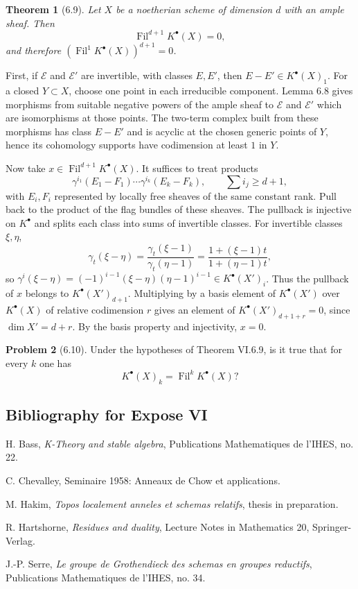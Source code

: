 \documentclass[11pt]{article}
\theoremstyle{plain}
\newtheorem{theorem}{Theorem}[section]
\theoremstyle{definition}
\newtheorem{problem}[theorem]{Problem}
\theoremstyle{remark}
\providecommand{\Fil}{\operatorname{Fil}}
\begin{document}
\begin{theorem}[6.9]\label{thm:VI.6.9}
Let $X$ be a noetherian scheme of dimension $d$ with an ample sheaf. Then
\[
\Fil^{d+1}K^{\bullet}(X)=0,
\]
and therefore $(\Fil^1K^{\bullet}(X))^{d+1}=0$.
\end{theorem}

First, if $\mathcal E$ and $\mathcal E'$ are invertible, with classes $E,E'$, then $E-E'\in K^{\bullet}(X)_1$. For a closed $Y\subset X$, choose one point in each irreducible component. Lemma 6.8 gives morphisms from suitable negative powers of the ample sheaf to $\mathcal E$ and $\mathcal E'$ which are isomorphisms at those points. The two-term complex built from these morphisms has class $E-E'$ and is acyclic at the chosen generic points of $Y$, hence its cohomology supports have codimension at least $1$ in $Y$.

Now take $x\in\Fil^{d+1}K^{\bullet}(X)$. It suffices to treat products
\[
\gamma^{i_1}(E_1-F_1)\cdots\gamma^{i_k}(E_k-F_k),
\qquad
\sum i_j\geq d+1,
\]
with $E_i,F_i$ represented by locally free sheaves of the same constant rank. Pull back to the product of the flag bundles of these sheaves. The pullback is injective on $K^{\bullet}$ and splits each class into sums of invertible classes. For invertible classes $\xi,\eta$,
\[
\gamma_t(\xi-\eta)=\frac{\gamma_t(\xi-1)}{\gamma_t(\eta-1)}=\frac{1+(\xi-1)t}{1+(\eta-1)t},
\]
so $\gamma^i(\xi-\eta)=(-1)^{i-1}(\xi-\eta)(\eta-1)^{i-1}\in K^{\bullet}(X')_i$. Thus the pullback of $x$ belongs to $K^{\bullet}(X')_{d+1}$. Multiplying by a basis element of $K^{\bullet}(X')$ over $K^{\bullet}(X)$ of relative codimension $r$ gives an element of $K^{\bullet}(X')_{d+1+r}=0$, since $\dim X'=d+r$. By the basis property and injectivity, $x=0$.

\begin{problem}[6.10]
Under the hypotheses of Theorem VI.6.9, is it true that for every $k$ one has
\[
K^{\bullet}(X)_k=\Fil^kK^{\bullet}(X)?
\]
\end{problem}

\subsection*{Bibliography for Expose VI}
\begin{enumerate}[label={[\arabic*]}]
\item H. Bass, \emph{K-Theory and stable algebra}, Publications Mathematiques de l'IHES, no. 22.
\item C. Chevalley, Seminaire 1958: Anneaux de Chow et applications.
\item M. Hakim, \emph{Topos localement anneles et schemas relatifs}, thesis in preparation.
\item R. Hartshorne, \emph{Residues and duality}, Lecture Notes in Mathematics 20, Springer-Verlag.
\item J.-P. Serre, \emph{Le groupe de Grothendieck des schemas en groupes reductifs}, Publications Mathematiques de l'IHES, no. 34.
\end{enumerate}
\end{document}
